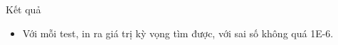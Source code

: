 Kết quả  
\begin{itemize}
	\item     Với mỗi test, in ra giá trị kỳ vọng tìm được, với sai số không quá 1E-6.   
\end{itemize}